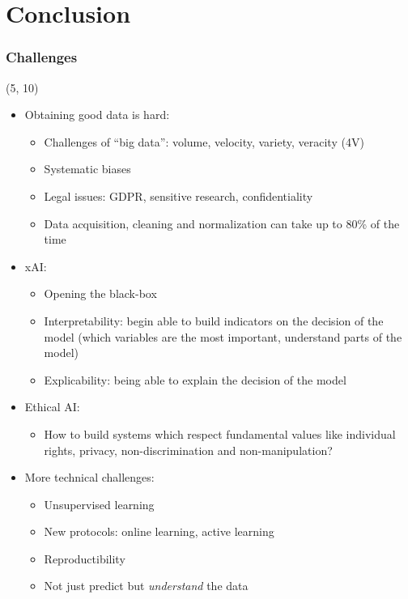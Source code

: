 \section{Conclusion}

\begin{frame}
  \frametitle{Challenges}

  \begin{textblock}{90}(5, 10)
    \begin{itemize}
    \item Obtaining good data is hard:
      \begin{itemize}
      \item Challenges of ``big data'': volume, velocity, variety, veracity (4V)
      \item Systematic biases
      \item Legal issues: GDPR, sensitive research, confidentiality
      \item Data acquisition, cleaning and normalization can take up to 80\% of
        the time
      \end{itemize}
    \item \acl{xAI}:
      \begin{itemize}
      \item Opening the black-box
      \item Interpretability: begin able to build indicators on the decision of the model
        (which variables are the most important, understand parts of the model)
      \item Explicability: being able to explain the decision of the model
      \end{itemize}
    \item Ethical \ac{AI}:
      \begin{itemize}
      \item How to build systems which respect fundamental values like individual rights, privacy, non-discrimination and non-manipulation?
      \end{itemize}
    \item More technical challenges:
      \begin{itemize}
      \item Unsupervised learning
      \item New protocols: online learning, active learning
      \item Reproductibility
      \item Not just predict but \emph{understand} the data
      \end{itemize}
    \end{itemize}
  \end{textblock}
\end{frame}


